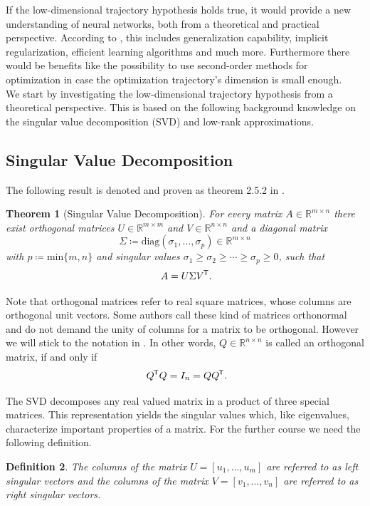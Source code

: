 \documentclass[11pt, a4paper]{article}
\newtheorem{theorem}{Theorem}[section]
\newtheorem{definition}[theorem]{Definition}
\newcommand{\R}{\mathbb{R}}
\newcommand*{\tr}{^{\mkern-1.5mu\mathsf{T}}}
\begin{document}
If the low-dimensional trajectory hypothesis holds true, it would provide a new understanding of neural networks, both from a theoretical and practical perspective. According to \cite{Paper}, this includes generalization capability, implicit regularization, efficient learning algorithms and much more. Furthermore there would be benefits like the possibility to use second-order methods for optimization in case the optimization trajectory's dimension is small enough. \\

We start by investigating the low-dimensional trajectory hypothesis from a theoretical perspective. This is based on the following background knowledge on the singular value decomposition (SVD) and low-rank approximations.

\subsection{Singular Value Decomposition}

The following result is denoted and proven as theorem 2.5.2 in \cite{SVD}.

\begin{theorem}[Singular Value Decomposition] \label{thm:svd}
For every matrix $A \in \R^{m \times n}$ there exist orthogonal matrices $U \in \R^{m \times m}$ and $V \in \R^{n \times n}$ and a diagonal matrix 
\[ \Sigma \coloneq \text{diag}(\sigma_1, \dots, \sigma_p) \in \R^{m \times n} \]
with $p \coloneq \text{min} \{ m,n \}$ and singular values $\sigma_1 \geq \sigma_2 \geq \cdots \geq \sigma_p \geq 0$, such that
\[ A = U \Sigma V\tr . \]
\end{theorem}

Note that orthogonal matrices refer to real square matrices, whose columns are orthogonal unit vectors. Some authors call these kind of matrices orthonormal and do not demand the unity of columns for a matrix to be orthogonal. However we will stick to the notation in \cite{SVD}. In other words, $Q \in \R^{n \times n}$ is called an orthogonal matrix, if and only if 
\[ Q \tr Q = I_n = Q Q \tr. \]

The SVD decomposes any real valued matrix in a product of three special matrices. This representation yields the singular values which, like eigenvalues, characterize important properties of a matrix. For the further course we need the following definition.

\begin{definition}
The columns of the matrix $U = [u_1, \dots, u_m]$ are referred to as left singular vectors and the columns of the matrix $V = [v_1, \dots, v_n]$ are referred to as right singular vectors.
\end{definition}
\end{document}

